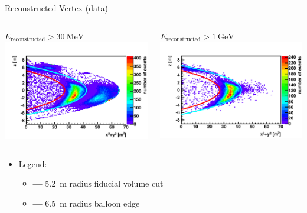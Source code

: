 \documentclass[14pt]{beamer}
\begin{document}
\begin{frame}{Reconstructed Vertex (data)}
	\begin{columns}[t]
		\begin{block}{\centering$E_{\text{reconstructed}} >
			\SI{30}{\mega\electronvolt}$}
			\centering
			\includegraphics[width=\linewidth]{kat_vertex_min30mev.pdf}
		\end{block}
		\begin{block}{\centering$E_{\text{reconstructed}} >
			\SI{1}{\giga\electronvolt}$}
			\centering
			\includegraphics[width=\linewidth]{kat_vertex_min1gev.pdf}
		\end{block}
	\end{columns}
	\begin{itemize}
		\item[] Legend:
			\begin{itemize}
				\item[] {\color{red}\textbf{---}} \SI{5.2}{\meter} radius
					fiducial volume cut
				\item[] {\color{cyan}\textbf{---}} \SI{6.5}{\meter} radius
					balloon edge
			\end{itemize}
	\end{itemize}
\end{frame}
\end{document}
